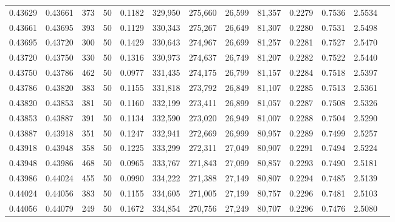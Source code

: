 \begin{tabular}{rrrrrrrrrrrrr}
0.43629 & 0.43661 &   373 &  50 &                                     0.1182 & 329,950 & 275,660 &  26,599 &  81,357 & 0.2279 & 0.7536 & 2.5534 \\
0.43661 & 0.43695 &   393 &  50 &                                     0.1129 & 330,343 & 275,267 &  26,649 &  81,307 & 0.2280 & 0.7531 & 2.5498 \\
0.43695 & 0.43720 &   300 &  50 &                                     0.1429 & 330,643 & 274,967 &  26,699 &  81,257 & 0.2281 & 0.7527 & 2.5470 \\
0.43720 & 0.43750 &   330 &  50 &                                     0.1316 & 330,973 & 274,637 &  26,749 &  81,207 & 0.2282 & 0.7522 & 2.5440 \\
0.43750 & 0.43786 &   462 &  50 &                                     0.0977 & 331,435 & 274,175 &  26,799 &  81,157 & 0.2284 & 0.7518 & 2.5397 \\
0.43786 & 0.43820 &   383 &  50 &                                     0.1155 & 331,818 & 273,792 &  26,849 &  81,107 & 0.2285 & 0.7513 & 2.5361 \\
0.43820 & 0.43853 &   381 &  50 &                                     0.1160 & 332,199 & 273,411 &  26,899 &  81,057 & 0.2287 & 0.7508 & 2.5326 \\
0.43853 & 0.43887 &   391 &  50 &                                     0.1134 & 332,590 & 273,020 &  26,949 &  81,007 & 0.2288 & 0.7504 & 2.5290 \\
0.43887 & 0.43918 &   351 &  50 &                                     0.1247 & 332,941 & 272,669 &  26,999 &  80,957 & 0.2289 & 0.7499 & 2.5257 \\
0.43918 & 0.43948 &   358 &  50 &                                     0.1225 & 333,299 & 272,311 &  27,049 &  80,907 & 0.2291 & 0.7494 & 2.5224 \\
0.43948 & 0.43986 &   468 &  50 &                                     0.0965 & 333,767 & 271,843 &  27,099 &  80,857 & 0.2293 & 0.7490 & 2.5181 \\
0.43986 & 0.44024 &   455 &  50 &                                     0.0990 & 334,222 & 271,388 &  27,149 &  80,807 & 0.2294 & 0.7485 & 2.5139 \\
0.44024 & 0.44056 &   383 &  50 &                                     0.1155 & 334,605 & 271,005 &  27,199 &  80,757 & 0.2296 & 0.7481 & 2.5103 \\
0.44056 & 0.44079 &   249 &  50 &                                     0.1672 & 334,854 & 270,756 &  27,249 &  80,707 & 0.2296 & 0.7476 & 2.5080 \\

\end{tabular}

